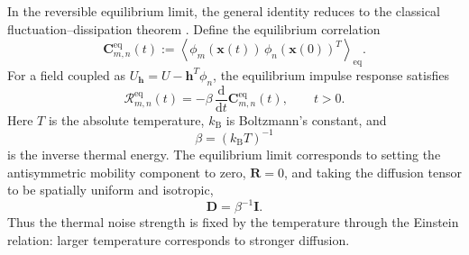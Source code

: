 \documentclass[11pt,twoside,fleqn]{article}
\renewcommand{\d}{\mathrm{d}}
\begin{document}
In the reversible equilibrium limit, the general identity reduces to the
classical fluctuation--dissipation theorem
\cite{CallenWelton1951,Kubo1957,Kubo1966}. Define the equilibrium correlation
\begin{equation}
    \bm{C}^{\mathrm{eq}}_{m,n}(t)
    :=
    \left\langle
        \phi_m(\bm{x}(t))\,
        \phi_n(\bm{x}(0))^T
    \right\rangle_{\mathrm{eq}} .
    \label{eq:equilibrium_correlation_definition}
\end{equation}
For a field coupled as \(U_{\bm{h}}=U-\bm{h}^T\phi_n\), the equilibrium impulse
response satisfies
\begin{equation}
    \bm{\mathcal{R}}^{\mathrm{eq}}_{m,n}(t)
    =
    -\beta\,\frac{\d}{\d t}
    \bm{C}^{\mathrm{eq}}_{m,n}(t),
    \qquad t>0.
    \label{eq:classical_equilibrium_fdt}
\end{equation}
Here \(T\) is the absolute temperature, \(k_{\mathrm B}\) is Boltzmann's
constant, and
\begin{equation}
    \beta=(k_{\mathrm B}T)^{-1}
    \label{eq:inverse_temperature_definition}
\end{equation}
is the inverse thermal energy. The equilibrium limit corresponds to setting the
antisymmetric mobility component to zero, \(\bm{R}=0\), and taking the
diffusion tensor to be spatially uniform and isotropic,
\begin{equation}
    \bm{D}=\beta^{-1}\bm{I}.
    \label{eq:equilibrium_isotropic_diffusion}
\end{equation}
Thus the thermal noise strength is fixed by the temperature through the
Einstein relation: larger temperature corresponds to stronger diffusion.
\end{document}
